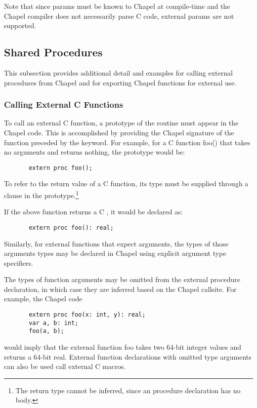 \begin{craychapel}
Note that since params must be known to Chapel at compile-time and
the Chapel compiler does not necessarily parse C code,
external params are not supported.
\end{craychapel}

\subsection{Shared Procedures}
\label{Shared_Procedures}

This subsection provides additional detail and examples for calling external
procedures from Chapel and for exporting Chapel functions for external use.

\subsubsection{Calling External C Functions}
\label{Calling_External_C_Functions}

To call an external C function, a prototype of
the routine must appear in the Chapel code.  This is accomplished by providing
the Chapel signature of the function preceded by the  keyword.  For
example, for a C function foo() that takes no arguments and returns
nothing, the prototype would be:
\begin{chapel}
\begin{verbatim}
       extern proc foo();
\end{verbatim}
\end{chapel}

To refer to the return value of a C function, its type must be supplied through
a  clause in the prototype.\footnote{The return type cannot be
inferred, since an  procedure declaration has no body.}

If the above function returns a C , it would be declared as:
\begin{chapel}
\begin{verbatim}
       extern proc foo(): real;
\end{verbatim}
\end{chapel}
Similarly, for external functions that expect arguments, the types of those
arguments types may be declared in Chapel using explicit argument type specifiers.

The types of function arguments may be omitted from the external procedure
declaration, in which case they are inferred based on the Chapel callsite.
For example, the Chapel code
\begin{chapel}
\begin{verbatim}
       extern proc foo(x: int, y): real;
       var a, b: int;
       foo(a, b);
\end{verbatim}
\end{chapel}
\noindent
would imply that the external function foo takes two 64-bit integer values
and returns a 64-bit real.  External function declarations with omitted type
arguments can also be used call external C macros.

